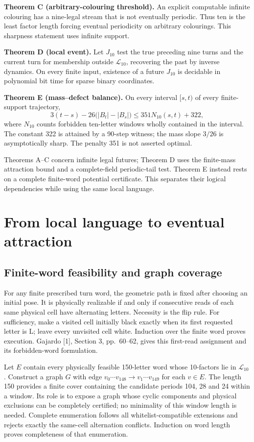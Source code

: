 \documentclass[
  11pt,
]{article}
\begin{document}
\textbf{Theorem C (arbitrary-colouring threshold).} An explicit
computable infinite colouring has a nine-legal stream that is not
eventually periodic. Thus ten is the least factor length forcing
eventual periodicity on arbitrary colourings. This sharpness statement
uses infinite support.

\textbf{Theorem D (local event).} Let \(J_{10}\) test the true preceding
nine turns and the current turn for membership outside
\(\mathcal L_{10}\), recovering the past by inverse dynamics. On every
finite input, existence of a future \(J_{10}\) is decidable in
polynomial bit time for sparse binary coordinates.

\textbf{Theorem E (mass--defect balance).} On every interval \([s,t)\)
of every finite-support trajectory,
\[3(t-s)-26\bigl(|B_t|-|B_s|\bigr)\le351N_{10}(s,t)+322,\] where
\(N_{10}\) counts forbidden ten-letter windows wholly contained in the
interval. The constant 322 is attained by a 90-step witness; the mass
slope \(3/26\) is asymptotically sharp. The penalty 351 is not asserted
optimal.

Theorems A--C concern infinite legal futures; Theorem D uses the
finite-mass attraction bound and a complete-field periodic-tail test. Theorem E instead rests on a complete finite-word
potential certificate. This separates their logical dependencies while
using the same local language.

\section{From local language to eventual
attraction}\label{from-local-language-to-eventual-attraction}

\subsection{Finite-word feasibility and graph coverage}\label{ten-2}

For any finite prescribed turn word, the geometric path is fixed after
choosing an initial pose. It is physically realizable if and only if
consecutive reads of each same physical cell have alternating letters.
Necessity is the flip rule. For sufficiency, make a visited cell
initially black exactly when its first requested letter is L; leave
every unvisited cell white. Induction over the finite word proves
execution. Gajardo {[}1{]}, Section 3, pp.\ 60--62, gives this
first-read assignment and its forbidden-word formulation.

Let \(E\) contain every physically feasible 150-letter word whose
10-factors lie in \(\mathcal L_{10}\). Construct a graph \(G\) with edge
\(v_0\cdots v_{148}\to v_1\cdots v_{149}\) for each \(v\in E\). The length 150 provides a finite cover containing the candidate periods
104, 28 and 24 within a window. Its role is to expose a graph whose cyclic
components and physical exclusions can be completely certified; no minimality
of this window length is needed.
Complete enumeration follows all whitelist-compatible extensions and
rejects exactly the same-cell alternation conflicts. Induction on word
length proves completeness of that enumeration.
\end{document}
